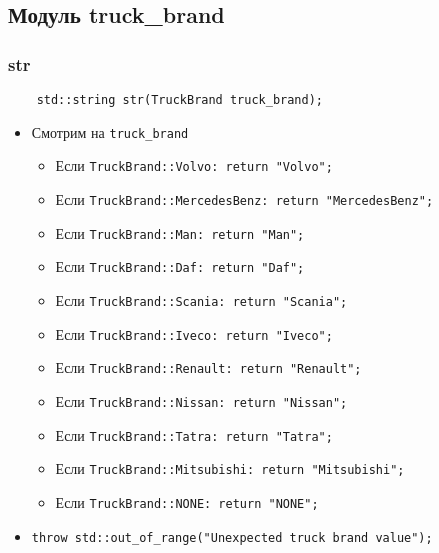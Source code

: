 \subsection{Модуль truck\_brand}

\subsubsection{str}

\begin{lstlisting}
    std::string str(TruckBrand truck_brand);
\end{lstlisting}

\begin{itemize}
    \item Смотрим на \verb|truck_brand|
        \begin{itemize}
            \item Если \verb|TruckBrand::Volvo: return "Volvo";|
            \item Если \verb|TruckBrand::MercedesBenz: return "MercedesBenz";|
            \item Если \verb|TruckBrand::Man: return "Man";|
            \item Если \verb|TruckBrand::Daf: return "Daf";|
            \item Если \verb|TruckBrand::Scania: return "Scania";|
            \item Если \verb|TruckBrand::Iveco: return "Iveco";|
            \item Если \verb|TruckBrand::Renault: return "Renault";|
            \item Если \verb|TruckBrand::Nissan: return "Nissan";|
            \item Если \verb|TruckBrand::Tatra: return "Tatra";|
            \item Если \verb|TruckBrand::Mitsubishi: return "Mitsubishi";|
            \item Если \verb|TruckBrand::NONE: return "NONE";|
        \end{itemize}
    \item \verb|throw std::out_of_range("Unexpected truck brand value");|
\end{itemize}

